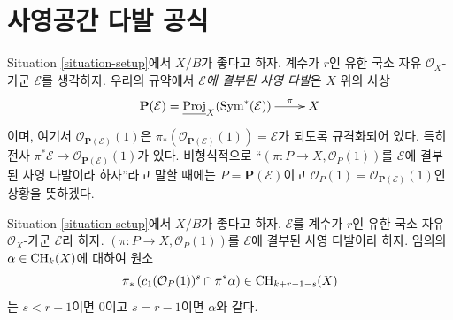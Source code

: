\section{사영공간 다발 공식}
\label{section-projective-space-bundle-formula}

\noindent
Situation \ref{situation-setup}에서 $X/B$가 좋다고 하자.
계수가 $r$인 유한 국소 자유 $\mathcal{O}_X$-가군
$\mathcal{E}$를 생각하자.
우리의 규약에서 {\it $\mathcal{E}$에 결부된 사영 다발}은
$X$ 위의 사상
$$
\xymatrix{
\mathbf{P}(\mathcal{E}) =
\underline{\text{Proj}}_X(\text{Sym}^*(\mathcal{E}))
\ar[r]^-\pi
& X
}
$$
이며, 여기서
$\mathcal{O}_{\mathbf{P}(\mathcal{E})}(1)$은
$\pi_*(\mathcal{O}_{\mathbf{P}(\mathcal{E})}(1)) = \mathcal{E}$가
되도록 규격화되어 있다. 특히 전사
$\pi^*\mathcal{E} \to \mathcal{O}_{\mathbf{P}(\mathcal{E})}(1)$가 있다.
비형식적으로 “$(\pi : P \to X, \mathcal{O}_P(1))$를
$\mathcal{E}$에 결부된 사영 다발이라 하자”라고 말할 때에는
$P = \mathbf{P}(\mathcal{E})$이고
$\mathcal{O}_P(1) = \mathcal{O}_{\mathbf{P}(\mathcal{E})}(1)$인
상황을 뜻하겠다.

\begin{lemma}
\label{lemma-cap-projective-bundle}
Situation \ref{situation-setup}에서 $X/B$가 좋다고 하자.
$\mathcal{E}$를 계수가 $r$인 유한 국소 자유
$\mathcal{O}_X$-가군 $\mathcal{E}$라 하자.
$(\pi : P \to X, \mathcal{O}_P(1))$를
$\mathcal{E}$에 결부된 사영 다발이라 하자.
임의의 $\alpha \in \mathop{\mathrm{CH}}\nolimits_k(X)$에 대하여 원소
$$
\pi_*\left(
c_1(\mathcal{O}_P(1))^s \cap \pi^*\alpha
\right)
\in
\mathop{\mathrm{CH}}\nolimits_{k + r - 1 - s}(X)
$$
는 $s < r - 1$이면 $0$이고 $s = r - 1$이면 $\alpha$와 같다.
\end{lemma}

